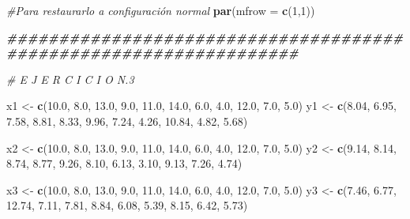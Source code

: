 \documentclass[
]{article}
\newenvironment{Shaded}{\begin{snugshade}}{\end{snugshade}}
\newcommand{\AttributeTok}[1]{\textcolor[rgb]{0.13,0.29,0.53}{#1}}
\newcommand{\CommentTok}[1]{\textcolor[rgb]{0.56,0.35,0.01}{\textit{#1}}}
\newcommand{\DecValTok}[1]{\textcolor[rgb]{0.00,0.00,0.81}{#1}}
\newcommand{\DocumentationTok}[1]{\textcolor[rgb]{0.56,0.35,0.01}{\textbf{\textit{#1}}}}
\newcommand{\FloatTok}[1]{\textcolor[rgb]{0.00,0.00,0.81}{#1}}
\newcommand{\FunctionTok}[1]{\textcolor[rgb]{0.13,0.29,0.53}{\textbf{#1}}}
\newcommand{\NormalTok}[1]{#1}
\newcommand{\OtherTok}[1]{\textcolor[rgb]{0.56,0.35,0.01}{#1}}
\begin{document}
\begin{Shaded}
\begin{Highlighting}[]
\CommentTok{\#Para restaurarlo a configuración normal }
\FunctionTok{par}\NormalTok{(}\AttributeTok{mfrow =} \FunctionTok{c}\NormalTok{(}\DecValTok{1}\NormalTok{,}\DecValTok{1}\NormalTok{))}

\DocumentationTok{\#\#\#\#\#\#\#\#\#\#\#\#\#\#\#\#\#\#\#\#\#\#\#\#\#\#\#\#\#\#\#\#\#\#\#\#\#\#\#\#\#\#\#\#\#\#\#\#\#\#\#\#\#\#\#\#\#\#\#\#\#\#\#\#\#\#}

\CommentTok{\# E J E R C I C I O N.3 }

\NormalTok{x1 }\OtherTok{\textless{}{-}} \FunctionTok{c}\NormalTok{(}\FloatTok{10.0}\NormalTok{, }\FloatTok{8.0}\NormalTok{, }\FloatTok{13.0}\NormalTok{, }\FloatTok{9.0}\NormalTok{, }\FloatTok{11.0}\NormalTok{, }\FloatTok{14.0}\NormalTok{, }\FloatTok{6.0}\NormalTok{, }\FloatTok{4.0}\NormalTok{, }\FloatTok{12.0}\NormalTok{, }\FloatTok{7.0}\NormalTok{, }\FloatTok{5.0}\NormalTok{)}
\NormalTok{y1 }\OtherTok{\textless{}{-}} \FunctionTok{c}\NormalTok{(}\FloatTok{8.04}\NormalTok{, }\FloatTok{6.95}\NormalTok{, }\FloatTok{7.58}\NormalTok{, }\FloatTok{8.81}\NormalTok{, }\FloatTok{8.33}\NormalTok{, }\FloatTok{9.96}\NormalTok{, }\FloatTok{7.24}\NormalTok{, }\FloatTok{4.26}\NormalTok{, }\FloatTok{10.84}\NormalTok{, }\FloatTok{4.82}\NormalTok{, }\FloatTok{5.68}\NormalTok{)}

\NormalTok{x2 }\OtherTok{\textless{}{-}} \FunctionTok{c}\NormalTok{(}\FloatTok{10.0}\NormalTok{, }\FloatTok{8.0}\NormalTok{, }\FloatTok{13.0}\NormalTok{, }\FloatTok{9.0}\NormalTok{, }\FloatTok{11.0}\NormalTok{, }\FloatTok{14.0}\NormalTok{, }\FloatTok{6.0}\NormalTok{, }\FloatTok{4.0}\NormalTok{, }\FloatTok{12.0}\NormalTok{, }\FloatTok{7.0}\NormalTok{, }\FloatTok{5.0}\NormalTok{)}
\NormalTok{y2 }\OtherTok{\textless{}{-}} \FunctionTok{c}\NormalTok{(}\FloatTok{9.14}\NormalTok{, }\FloatTok{8.14}\NormalTok{, }\FloatTok{8.74}\NormalTok{, }\FloatTok{8.77}\NormalTok{, }\FloatTok{9.26}\NormalTok{, }\FloatTok{8.10}\NormalTok{, }\FloatTok{6.13}\NormalTok{, }\FloatTok{3.10}\NormalTok{, }\FloatTok{9.13}\NormalTok{, }\FloatTok{7.26}\NormalTok{, }\FloatTok{4.74}\NormalTok{)}

\NormalTok{x3 }\OtherTok{\textless{}{-}} \FunctionTok{c}\NormalTok{(}\FloatTok{10.0}\NormalTok{, }\FloatTok{8.0}\NormalTok{, }\FloatTok{13.0}\NormalTok{, }\FloatTok{9.0}\NormalTok{, }\FloatTok{11.0}\NormalTok{, }\FloatTok{14.0}\NormalTok{, }\FloatTok{6.0}\NormalTok{, }\FloatTok{4.0}\NormalTok{, }\FloatTok{12.0}\NormalTok{, }\FloatTok{7.0}\NormalTok{, }\FloatTok{5.0}\NormalTok{)}
\NormalTok{y3 }\OtherTok{\textless{}{-}} \FunctionTok{c}\NormalTok{(}\FloatTok{7.46}\NormalTok{, }\FloatTok{6.77}\NormalTok{, }\FloatTok{12.74}\NormalTok{, }\FloatTok{7.11}\NormalTok{, }\FloatTok{7.81}\NormalTok{, }\FloatTok{8.84}\NormalTok{, }\FloatTok{6.08}\NormalTok{, }\FloatTok{5.39}\NormalTok{, }\FloatTok{8.15}\NormalTok{, }\FloatTok{6.42}\NormalTok{, }\FloatTok{5.73}\NormalTok{)}


\end{Highlighting}
\end{Shaded}
\end{document}
